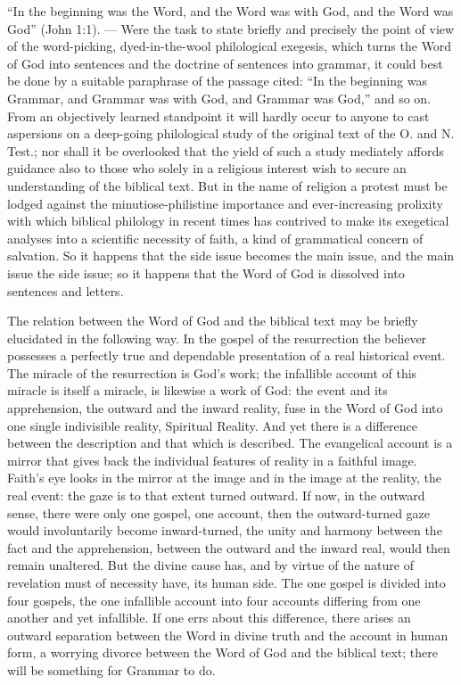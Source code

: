 \documentclass[12pt,a4paper,openany]{book}
\newcommand{\opage}[1]{\marginnote{\footnotesize\textit{[#1]}}}
\begin{document}
``In the beginning was the Word, and the Word was with God,
and the Word was God'' (John 1:1). --- Were the task
to state briefly and precisely the point of view of the word-picking,
dyed-in-the-wool philological exegesis, which turns the Word of God into
sentences and the doctrine of sentences into grammar, it could
best be done by a suitable paraphrase of the passage cited:
``In the beginning was Grammar, and Grammar
was with God, and Grammar was God,'' and so on.
From an objectively learned standpoint it will hardly occur to
anyone to cast aspersions on a deep-going philological
study of the original text of the O. and N. Test.; nor
shall it be overlooked that the yield of such a study
mediately affords guidance also to those who
solely in a religious interest wish to secure an understanding of
the biblical text. But in the name of religion a protest
must be lodged against the minutiose-philistine importance
and ever-increasing prolixity with which biblical philology
in recent times has contrived to make its exegetical analyses
into a scientific necessity of faith, a kind of
grammatical concern of salvation. So it happens that
the side issue becomes the main issue, and the main issue the side issue; so it happens
that the Word of God is dissolved into sentences and letters.

The relation between the Word of God and the biblical text
may be briefly elucidated in the following way. In the gospel of the resurrection
the believer possesses a perfectly true and
\setcounter{footnote}{0}%
\opage{13}dependable presentation of a real historical event.
The miracle of the resurrection is God's work; the infallible
account of this miracle is itself a miracle, is
likewise a work of God: the event and its apprehension,
the outward and the inward reality, fuse in the Word of God
into one single indivisible reality, Spiritual Reality.
And yet there is a difference between the description
and that which is described. The evangelical account is a
mirror that gives back the individual features of reality in a faithful
image. Faith's eye looks in the mirror at the image and in
the image at the reality, the real event:
the gaze is to that extent turned outward. If now, in the outward
sense, there were only one gospel, one account,
then the outward-turned gaze would involuntarily become inward-turned,
the unity and harmony between the fact and the apprehension,
between the outward and the inward real,
would then remain unaltered. But the divine
cause has, and by virtue of the nature of revelation must of necessity
have, its human side. The one gospel
is divided into four gospels, the one infallible account into
four accounts differing from one another and yet infallible.
If one errs about this difference, there arises
an outward separation between the Word in divine
truth and the account in human form, a worrying
divorce between the Word of God and the biblical
text; there will be something for Grammar to do.
\end{document}
